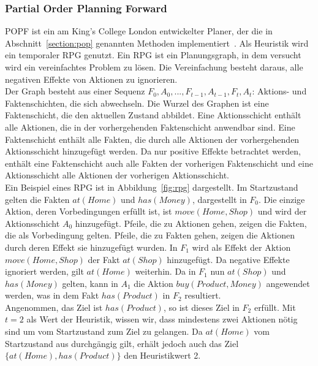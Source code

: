 \subsubsection{Partial Order Planning Forward}
\ac{POPF} ist ein am King’s College London entwickelter Planer, der die in Abschnitt~\ref{section:pop} genannten Methoden implementiert~\citep{popf}.
Als Heuristik wird ein temporaler \ac{RPG} genutzt.
Ein \ac{RPG} ist ein Planungsgraph, in dem versucht wird ein vereinfachtes Problem zu lösen.
Die Vereinfachung besteht daraus, alle negativen Effekte von Aktionen zu ignorieren.\\
Der Graph besteht aus einer Sequenz $F_0, A_0, ..., F_{t-1}, A_{t-1}, F_t, A_t$: Aktions- und Faktenschichten, die sich abwechseln.
Die Wurzel des Graphen ist eine Faktenschicht, die den aktuellen Zustand abbildet.
Eine Aktionsschicht enthält alle Aktionen, die in der vorhergehenden Faktenschicht anwendbar sind.
Eine Faktenschicht enthält alle Fakten, die durch alle Aktionen der vorhergehenden Aktionsschicht hinzugefügt werden.
Da nur positive Effekte betrachtet werden, enthält eine Faktenschicht auch alle Fakten der vorherigen Faktenschicht und eine Aktionsschicht alle Aktionen der vorherigen Aktionsschicht.\\
Ein Beispiel eines \ac{RPG} ist in Abbildung~\ref{fig:rpg} dargestellt.
Im Startzustand gelten die Fakten $at(Home)$ und $has(Money)$, dargestellt in $F_0$.
Die einzige Aktion, deren Vorbedingungen erfüllt ist, ist $move(Home, Shop)$ und wird der Aktionsschicht $A_0$ hinzugefügt.
Pfeile, die zu Aktionen gehen, zeigen die Fakten, die als Vorbedingung gelten.
Pfeile, die zu Fakten gehen, zeigen die Aktionen durch deren Effekt sie hinzugefügt wurden.
In $F_1$ wird als Effekt der Aktion $move(Home, Shop)$ der Fakt $at(Shop)$ hinzugefügt.
Da negative Effekte ignoriert werden, gilt $at(Home)$ weiterhin.
Da in $F_1$ nun $at(Shop)$ und $has(Money)$ gelten, kann in $A_1$ die Aktion $buy(Product, Money)$ angewendet werden, was in dem Fakt $has(Product)$ in $F_2$ resultiert.\\
Angenommen, das Ziel ist $has(Product)$, so ist dieses Ziel in $F_2$ erfüllt.
Mit $t = 2$ als Wert der Heuristik, wissen wir, dass mindestens zwei Aktionen nötig sind um vom Startzustand zum Ziel zu gelangen.
Da $at(Home)$ vom Startzustand aus durchgängig gilt, erhält jedoch auch das Ziel $\{at(Home),has(Product)\}$ den Heuristikwert 2.\\
